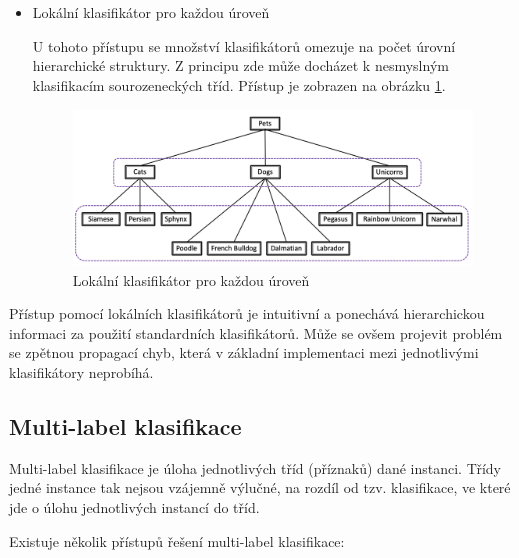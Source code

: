 \documentclass[thesis=M,czech]{FITthesis}[2019/12/23]
\begin{document}
\begin{enumerate}
\begin{itemize}
        \item Lokální klasifikátor pro každou úroveň
        
        U tohoto přístupu se množství klasifikátorů omezuje na počet úrovní hierarchické struktury. Z principu zde může docházet k nesmyslným klasifikacím sourozeneckých tříd. Přístup je zobrazen na obrázku \ref{fig:weiss2019local3}.
    
        \begin{figure}\centering
        	\includegraphics[width=1\textwidth]{images/weiss2019/hierarchical_class_local3.png}
        	\caption{Lokální klasifikátor pro každou úroveň\cite{weiss2019}}\label{fig:weiss2019local3}
        \end{figure}
    \end{itemize}
    
    Přístup pomocí lokálních klasifikátorů je intuitivní a ponechává hierarchickou informaci za použití standardních klasifikátorů. Může se ovšem projevit problém se zpětnou propagací chyb, která v základní implementaci mezi jednotlivými klasifikátory neprobíhá.
    
\end{enumerate}

\subsection{Multi-label klasifikace}
\label{sec:multilabel_classification}

Multi-label klasifikace je úloha  jednotlivých tříd (příznaků) dané instanci. Třídy jedné instance tak nejsou vzájemně výlučné, na rozdíl od tzv.  klasifikace, ve které jde o úlohu  jednotlivých instancí do tříd.

Existuje několik přístupů řešení multi-label klasifikace\cite{nooney2018}:
\end{document}

